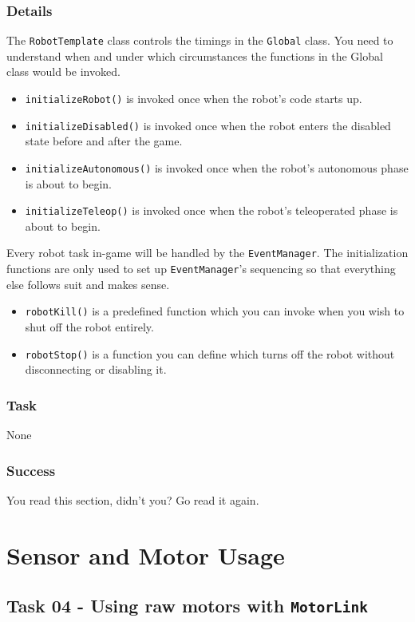 \documentclass[a4paper]{article}
\begin{document}
\subsubsection{Details} The \lstinline{RobotTemplate} class controls the timings in the \lstinline{Global} class. You need to understand when and under which circumstances the functions in the Global class would be invoked. \begin{itemize}\item{\lstinline{initializeRobot()} is invoked once when the robot's code starts up.}\item{\lstinline{initializeDisabled()} is invoked once when the robot enters the disabled state before and after the game.}\item{\lstinline{initializeAutonomous()} is invoked once when the robot's autonomous phase is about to begin.}\item{\lstinline{initializeTeleop()} is invoked once when the robot's teleoperated phase is about to begin.}\end{itemize}

Every robot task in-game will be handled by the \lstinline{EventManager}. The initialization functions are only used to set up \lstinline{EventManager}'s sequencing so that everything else follows suit and makes sense. \begin{itemize}\item{\lstinline{robotKill()} is a predefined function which you can invoke when you wish to shut off the robot entirely.}\item{\lstinline{robotStop()} is a function you can define which turns off the robot without disconnecting or disabling it.}\end{itemize}
\subsubsection{Task} None
\subsubsection{Success} You read this section, didn't you? Go read it again.


\section{Sensor and Motor Usage}\setcounter{subsection}{3}

\subsection{Task 04 - Using raw motors with \lstinline{MotorLink}}
\end{document}
